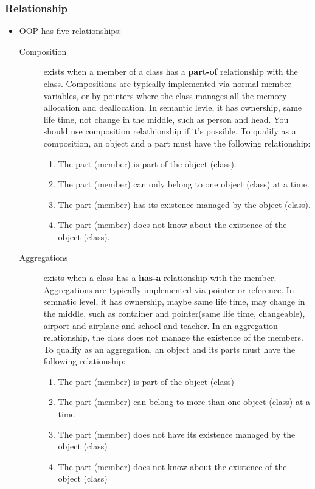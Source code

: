 \documentclass[a4paper,11pt,twoside]{book}
\begin{document}
\subsubsection{Relationship}

\begin{itemize}
	\item OOP has five relationships:
	\begin{description}
		\item[Composition] exists when a member of a class has a \textbf{part-of} relationship with the class.  Compositions are typically implemented via normal member variables, or by pointers where the class manages all the memory allocation and deallocation. In semantic levle, it has ownership, same life time, not change in the middle, such as person and head. You should use composition relathionship if it's possible. To qualify as a composition, an object and a part must have the following relationship:
		\begin{enumerate}
			\item The part (member) is part of the object (class).
			\item The part (member) can only belong to one object (class) at a time.
			\item The part (member) has its existence managed by the object (class).
			\item The part (member) does not know about the existence of the object (class).
		\end{enumerate}
	
	
	
	\item[Aggregations] exists when a class has a \textbf{has-a} relationship with the member. Aggregations are typically implemented via pointer or reference. In semnatic level, it has ownership, maybe same life time, may change in the middle,  such as container and pointer(same life time, changeable), airport and airplane and school and teacher. In an aggregation relationship, the class does not manage the existence of the members. To qualify as an aggregation, an object and its parts must have the following relationship:
	
	\begin{enumerate}
		\item The part (member) is part of the object (class)
		\item The part (member) can belong to more than one object (class) at a time
		\item The part (member) does not have its existence managed by the object (class)
		\item The part (member) does not know about the existence of the object (class)
	\end{enumerate}



\end{description}
\end{itemize}
\end{document}
